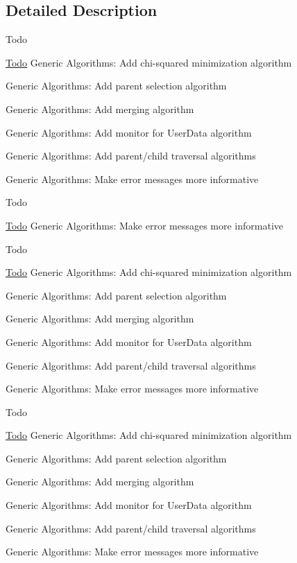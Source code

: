 \subsection{Detailed Description}
\begin{DoxyRefDesc}{Todo}
\item[\hyperlink{todo__todo000001}{Todo}]Generic Algorithms\+: Add chi-\/squared minimization algorithm 

Generic Algorithms\+: Add parent selection algorithm 

Generic Algorithms\+: Add merging algorithm 

Generic Algorithms\+: Add monitor for User\+Data algorithm 

Generic Algorithms\+: Add parent/child traversal algorithms 

Generic Algorithms\+: Make error messages more informative \end{DoxyRefDesc}


\begin{DoxyRefDesc}{Todo}
\item[\hyperlink{todo__todo000002}{Todo}]Generic Algorithms\+: Make error messages more informative \end{DoxyRefDesc}


\begin{DoxyRefDesc}{Todo}
\item[\hyperlink{todo__todo000003}{Todo}]Generic Algorithms\+: Add chi-\/squared minimization algorithm 

Generic Algorithms\+: Add parent selection algorithm 

Generic Algorithms\+: Add merging algorithm 

Generic Algorithms\+: Add monitor for User\+Data algorithm 

Generic Algorithms\+: Add parent/child traversal algorithms 

Generic Algorithms\+: Make error messages more informative \end{DoxyRefDesc}


\begin{DoxyRefDesc}{Todo}
\item[\hyperlink{todo__todo000004}{Todo}]Generic Algorithms\+: Add chi-\/squared minimization algorithm 

Generic Algorithms\+: Add parent selection algorithm 

Generic Algorithms\+: Add merging algorithm 

Generic Algorithms\+: Add monitor for User\+Data algorithm 

Generic Algorithms\+: Add parent/child traversal algorithms 

Generic Algorithms\+: Make error messages more informative \end{DoxyRefDesc}


